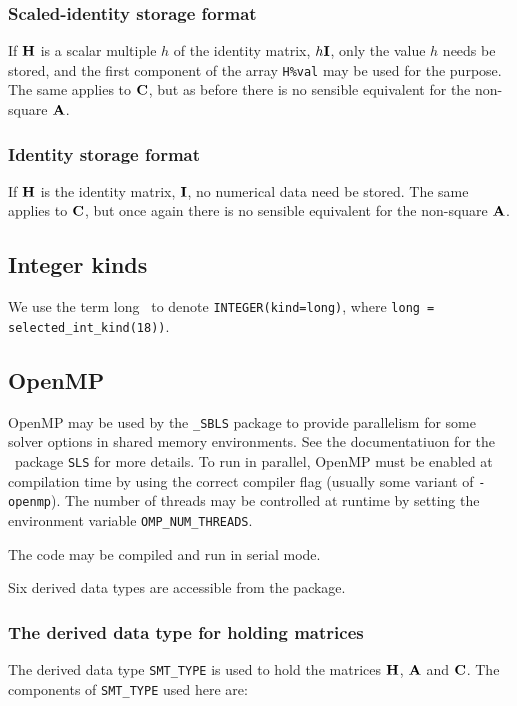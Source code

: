 \documentclass{galahad}
\newcommand{\packagename}{SBLS}
\newcommand{\fullpackagename}{\libraryname\_\packagename}
\begin{document}
\subsubsection{Scaled-identity storage format}\label{scaled}
If ${\mathbf{H}}$ is a scalar multiple $h$ of the identity matrix, $h {\mathbf{I}}$,
only the value $h$ needs be stored,
and the first component of the array {\tt H\%val}
 may be used for
the purpose. The same applies to ${\mathbf{C}}$, but
as before there is no sensible equivalent for the non-square ${\mathbf{A}}$.

\subsubsection{Identity storage format}\label{identity}
If ${\mathbf{H}}$ is the identity matrix, ${\mathbf{I}}$,
no numerical data need be stored. The same applies to ${\mathbf{C}}$, but
once again there is no sensible equivalent for the non-square ${\mathbf{A}}$.

\subsection{Integer kinds}\label{Integer kinds}
We use the term
long \integer\ to denote {\tt INTEGER\-(kind=long)}, where
{\tt long = selected\_int\_kind(18))}.


\subsection{OpenMP}
OpenMP may be used by the {\tt \fullpackagename} package to provide
parallelism for some solver options in shared memory environments.
See the documentatiuon for the \galahad\ package {\tt SLS} for more details.
To run in parallel, OpenMP
must be enabled at compilation time by using the correct compiler flag
(usually some variant of {\tt -openmp}).
The number of threads may be controlled at runtime
by setting the environment variable {\tt OMP\_NUM\_THREADS}.

\noindent
The code may be compiled and run in serial mode.


\galtypes
Six derived data types are accessible from the package.


\subsubsection{The derived data type for holding matrices}\label{typesmt}
The derived data type {\tt SMT\_TYPE} is used to hold the matrices ${\mathbf{H}}$,
${\mathbf{A}}$ and ${\mathbf{C}}$. The components of {\tt SMT\_TYPE} used here are:
\end{document}

